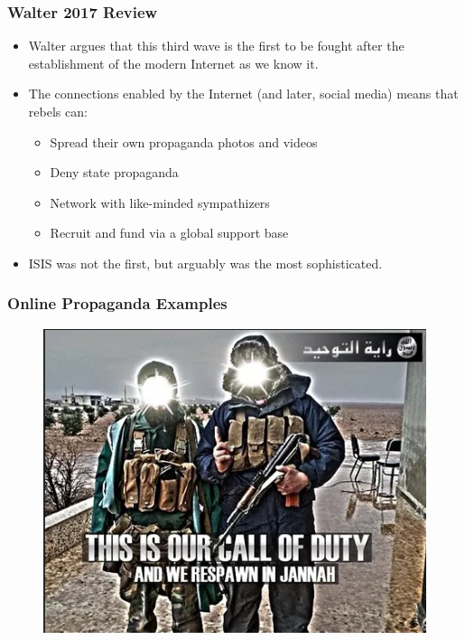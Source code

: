 \documentclass{beamer}
\begin{document}
\begin{frame} 
	\frametitle{\LARGE{Walter 2017 Review}}
	\begin{itemize}
		\item Walter argues that this third wave is the first to be fought after the establishment of the modern Internet as we know it. \pause
		\item The connections enabled by the Internet (and later, social media) means that rebels can: \pause
		\begin{itemize}
			\item Spread their own propaganda photos and videos
			\item Deny state propaganda
			\item Network with like-minded sympathizers
			\item Recruit and fund via a global support base \pause
		\end{itemize}
	\item ISIS was not the first, but arguably was the most sophisticated.
	\end{itemize}
\end{frame}

\begin{frame} 
	\frametitle{\LARGE{Online Propaganda Examples}}
	\begin{figure}[ht!]
		\centering
		\includegraphics[width=\textwidth,height=0.9\textheight,keepaspectratio]{ISISprop1.png}
	\end{figure}
\end{frame}
\end{document}
